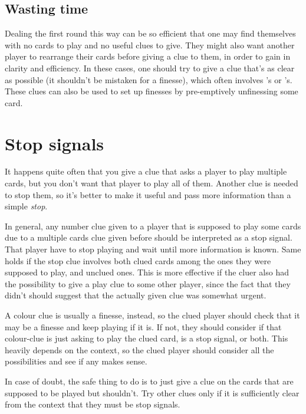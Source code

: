 \documentclass[a4paper]{article}
\theoremstyle{plain}
\theoremstyle{definition}
\begin{document}
\subsection{Wasting time}

Dealing the first round this way can be so efficient that one may find themselves with no cards to play and no useful clues to give. They might also want another player to rearrange their cards before giving a clue to them, in order to gain in clarity and efficiency. In these cases, one should try to give a clue that's as clear as possible (it shouldn't be mistaken for a finesse), which often involves 's or 's. These clues can also be used to set up finesses by pre-emptively unfinessing some card. 
                                                           
\section{Stop signals}
\label{stopsignals}

It happens quite often that you give a clue that asks a player to play multiple cards, but you don't want that player to play all of them. Another clue is needed to stop them, so it's better to make it useful and pass more information than a simple \textit{stop}.

In general, any number clue given to a player that is supposed to play some cards due to a multiple cards clue given before should be interpreted as a stop signal. That player have to stop playing and wait until more information is known. Same holds if the stop clue involves both clued cards among the ones they were supposed to play, and unclued ones. This is more effective if the cluer also had the possibility to give a play clue to some other player, since the fact that they didn't should suggest that the actually given clue was somewhat urgent.

A colour clue is usually a finesse, instead, so the clued player should check that it may be a finesse and keep playing if it is. If not, they should consider if that colour-clue is just asking to play the clued card, is a stop signal, or both. This heavily depends on the context, so the clued player should consider all the possibilities and see if any makes sense.

In case of doubt, the safe thing to do is to just give a clue on the cards that are supposed to be played but shouldn't. Try other clues only if it is sufficiently clear from the context that they must be stop signals.
\end{document}
